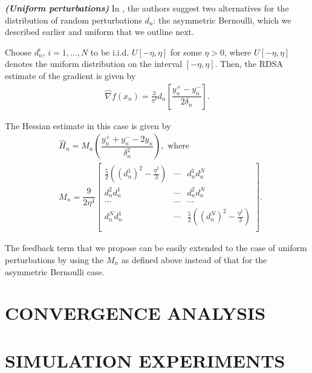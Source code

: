 \documentclass[letterpaper, 10 pt, conference]{ieeeconf}  %
\begin{document}
\begin{remark}\textbf{\textit{(Uniform perturbations)}}
\label{remark:unif}
In \cite{prashanth2015rdsa}, the authors suggest two alternatives for the distribution of random perturbations $d_n$: the asymmetric Bernoulli, which we described earlier and uniform that we outline next.

Choose $d_n^i$, $ i=1,\ldots,N$ to be i.i.d. $U[-\eta,\eta]$ for some $\eta>0$, where $U[-\eta,\eta]$ denotes the uniform distribution on the interval $[-\eta,\eta]$.
Then, the RDSA estimate of the gradient is given by
\begin{align}
\label{eq:grad-unif}
\widehat\nabla f(x_n) = \frac3{\eta^2} d_n \left[ \dfrac{y_n^+ - y_n^-}{2\delta_n}\right].
\end{align}

The Hessian estimate in this case is given by
\begin{align}
\label{eq:2rdsa-estimate-unif}
&\widehat H_n =  M_n \left(\dfrac{y_n^+ + y_n^- - 2 y_n}{\delta_n^2}\right), \text{ where } \\
& M_n =
\dfrac{9}{2\eta^4}\left[
\begin{array}{cccc}
\frac{5}{2}\left((d_n^1)^2-\frac{\eta^2}{3}\right) & \cdots & d_n^1 d_n^N\\
d_n^2 d_n^1  &  \cdots & d_n^2 d_n^N\\
\cdots&\cdots&\cdots\\
d_n^N d_n^1 & \cdots &  \frac{5}{2}\left((d_n^N)^2-\frac{\eta^2}{3}\right) \\
\end{array}
\right].\nonumber
\end{align}

The feedback term that we propose can be easily extended to the case of uniform perturbations by using the $M_n$ as defined above instead of that for the asymmetric Bernoulli case.
\end{remark}


\section{CONVERGENCE ANALYSIS}
\label{sec:2rdsa-results}






\section{SIMULATION EXPERIMENTS}
\label{sec:expts}
\end{document}
